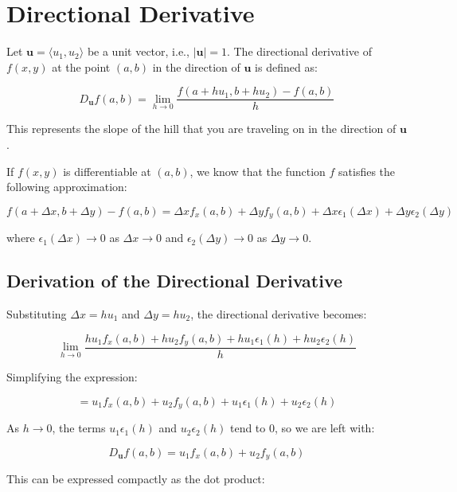 \documentclass{report}
\begin{document}


\section{Directional Derivative}

Let $\mathbf{u} = \langle u_1, u_2 \rangle$ be a unit vector, i.e., $|\mathbf{u}| = 1$. The directional derivative of $f(x, y)$ at the point $(a, b)$ in the direction of $\mathbf{u}$ is defined as:

\[
	D_{\mathbf{u}} f(a, b) = \lim_{h \to 0} \frac{f(a + h u_1, b + h u_2) - f(a, b)}{h}
\]

This represents the slope of the hill that you are traveling on in the direction of $\mathbf{u}$.

If $f(x, y)$ is differentiable at $(a, b)$, we know that the function $f$ satisfies the following approximation:

\[
	f(a + \Delta x, b + \Delta y) - f(a, b) = \Delta x f_x(a, b) + \Delta y f_y(a, b) + \Delta x \epsilon_1(\Delta x) + \Delta y \epsilon_2(\Delta y)
\]

where $\epsilon_1(\Delta x) \to 0$ as $\Delta x \to 0$ and $\epsilon_2(\Delta y) \to 0$ as $\Delta y \to 0$.

\subsection{Derivation of the Directional Derivative}

Substituting $\Delta x = h u_1$ and $\Delta y = h u_2$, the directional derivative becomes:

\[
	\lim_{h \to 0} \frac{h u_1 f_x(a, b) + h u_2 f_y(a, b) + h u_1 \epsilon_1(h) + h u_2 \epsilon_2(h)}{h}
\]

Simplifying the expression:

\[
	= u_1 f_x(a, b) + u_2 f_y(a, b) + u_1 \epsilon_1(h) + u_2 \epsilon_2(h)
\]

As $h \to 0$, the terms $u_1 \epsilon_1(h)$ and $u_2 \epsilon_2(h)$ tend to $0$, so we are left with:

\[
	D_{\mathbf{u}} f(a, b) = u_1 f_x(a, b) + u_2 f_y(a, b)
\]

This can be expressed compactly as the dot product:
\end{document}
